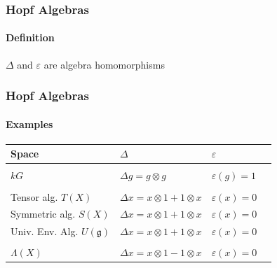 \documentclass{beamer}
\begin{document}
\begin{frame}
\frametitle{Hopf Algebras}

\framesubtitle{Definition}






 $\Delta$ and $\varepsilon$ are algebra homomorphisms

\medskip


\begin{center}
\end{center}



\end{frame}







\begin{frame}


\frametitle{Hopf Algebras}
%

\framesubtitle{Examples}

\begin{tabularx}{\textwidth}{lll>{\raggedright\arraybackslash}X}
\toprule
Space & $\Delta$ & $\varepsilon$
\\
\midrule
\\
$kG$  & $\Delta g = g \otimes g$ & $\varepsilon(g) = 1$ \\
\\
Tensor alg. $T(X)$ & $\Delta x = x \otimes 1 + 1 \otimes x$ & $\varepsilon(x) = 0$ \\
Symmetric alg. $S(X)$ & $\Delta x = x \otimes 1 + 1 \otimes x$ & $\varepsilon(x) = 0$ \\
Univ. Env. Alg. $U(\mathfrak{g})$ & $\Delta x = x \otimes 1 + 1 \otimes x$ & $\varepsilon(x) = 0$
\\
\\
$\Lambda(X)$ & $\Delta x = x \otimes 1 - 1 \otimes x$ & $\varepsilon(x) = 0$
\\
\bottomrule
\end{tabularx}



\end{frame}
\end{document}
